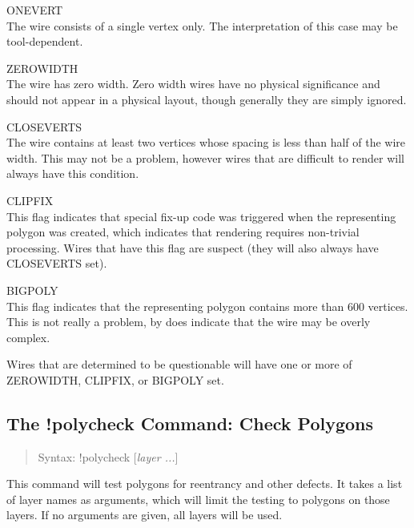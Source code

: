 \begin{description}
\item{\vt ONEVERT}\\
The wire consists of a single vertex only.  The interpretation of
this case may be tool-dependent.

\item{\vt ZEROWIDTH}\\
The wire has zero width.  Zero width wires have no physical
significance and should not appear in a physical layout, though
generally they are simply ignored.

\item{\vt CLOSEVERTS}\\
The wire contains at least two vertices whose spacing is less than
half of the wire width.  This may not be a problem, however wires
that are difficult to render will always have this condition.

\item{\vt CLIPFIX}\\
This flag indicates that special fix-up code was triggered when the
representing polygon was created, which indicates that rendering
requires non-trivial processing.  Wires that have this flag are
suspect (they will also always have {\vt CLOSEVERTS} set).

\item{\vt BIGPOLY}\\
This flag indicates that the representing polygon contains more
than 600 vertices.  This is not really a problem, by does indicate
that the wire may be overly complex.
\end{description}

Wires that are determined to be questionable will have one or more of
{\vt ZEROWIDTH}, {\vt CLIPFIX}, or {\vt BIGPOLY} set.

\subsection{The {\cb !polycheck} Command: Check Polygons}
\begin{quote}
Syntax: {\vt !polycheck} [{\it layer ...}]
\end{quote}
This command will test polygons for reentrancy and other defects.  It
takes a list of layer names as arguments, which will limit the testing
to polygons on those layers.  If no arguments are given, all layers
will be used.

